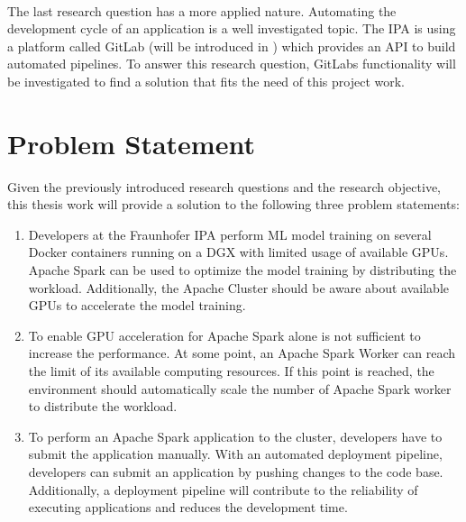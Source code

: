 \paragraph{}
The last research question has a more applied nature.
Automating the development cycle of an application is a well investigated topic.
The IPA is using a platform called GitLab (will be introduced in ) which provides an API to build automated pipelines.
To answer this research question, GitLabs functionality will be investigated to find a solution that fits the need of this project work.


\section{Problem Statement}
\label{sec:01_introduction_problem}
Given the previously introduced research questions and the research objective, this thesis work will provide a solution to the following three problem statements:

\begin{enumerate}
\item Developers at the Fraunhofer IPA perform ML model training on several Docker containers running on a DGX with limited usage of available GPUs.
Apache Spark can be used to optimize the model training by distributing the workload.
Additionally, the Apache Cluster should be aware about available GPUs to accelerate the model training.

\item To enable GPU acceleration for Apache Spark alone is not sufficient to increase the performance.
At some point, an Apache Spark Worker can reach the limit of its available computing resources.
If this point is reached, the environment should automatically scale the number of Apache Spark worker to distribute the workload.

\item To perform an Apache Spark application to the cluster, developers have to submit the application manually.
With an automated deployment pipeline, developers can submit an application by pushing changes to the code base.
Additionally, a deployment pipeline will contribute to the reliability of executing applications and reduces the development time.
\end{enumerate}


